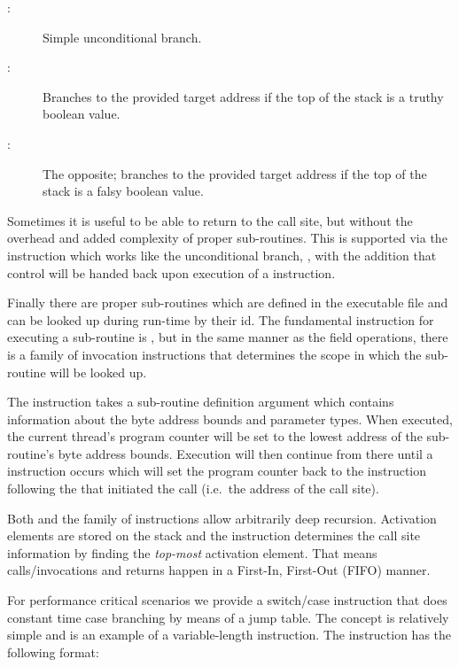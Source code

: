\begin{description}

\item[:]

  Simple unconditional branch.

\item[:]

  Branches to the provided target address if the top of the stack is a truthy
  boolean value.

\item[:]

  The opposite; branches to the provided target address if the top of the stack
  is a falsy boolean value.

\end{description}

Sometimes it is useful to be able to return to the call site, but without the
overhead and added complexity of proper sub-routines. This is supported via the
 instruction which works like the unconditional branch, ,
with the addition that control will be handed back upon execution of a
 instruction.

Finally there are proper sub-routines which are defined in the executable file
and can be looked up during run-time by their id. The fundamental instruction
for executing a sub-routine is , but in the same manner as the
field operations, there is a family of invocation instructions that determines
the scope in which the sub-routine will be looked up.

The  instruction takes a sub-routine definition argument which
contains information about the byte address bounds and parameter types. When
executed, the current thread's program counter will be set to the lowest address
of the sub-routine's byte address bounds. Execution will then continue from
there until a  instruction occurs which will set the program
counter back to the instruction following the  that initiated the
call (i.e.~the address of the call site).

Both  and the  family of instructions allow
arbitrarily deep recursion. Activation elements are stored on the stack and the
 instruction determines the call site information by finding the
\emph{top-most} activation element. That means calls/invocations and returns
happen in a First-In, First-Out (FIFO) manner.

For performance critical scenarios we provide a switch/case instruction that
does constant time case branching by means of a jump table. The concept is
relatively simple and is an example of a variable-length instruction. The
 instruction has the following format:

